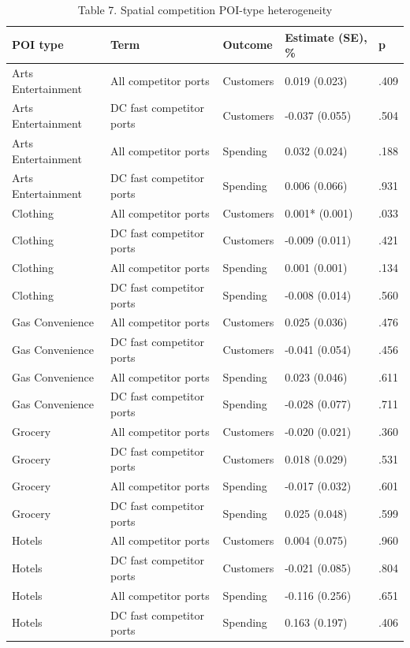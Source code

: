 \begin{table}[!htbp]
\centering
\caption{Table 7. Spatial competition POI-type heterogeneity}
\begin{tabular}{lllll}
\toprule
POI type & Term & Outcome & Estimate (SE), \% & p \\
\midrule
Arts Entertainment & All competitor ports & Customers & 0.019 (0.023) & .409 \\
Arts Entertainment & DC fast competitor ports & Customers & -0.037 (0.055) & .504 \\
Arts Entertainment & All competitor ports & Spending & 0.032 (0.024) & .188 \\
Arts Entertainment & DC fast competitor ports & Spending & 0.006 (0.066) & .931 \\
Clothing & All competitor ports & Customers & 0.001* (0.001) & .033 \\
Clothing & DC fast competitor ports & Customers & -0.009 (0.011) & .421 \\
Clothing & All competitor ports & Spending & 0.001 (0.001) & .134 \\
Clothing & DC fast competitor ports & Spending & -0.008 (0.014) & .560 \\
Gas Convenience & All competitor ports & Customers & 0.025 (0.036) & .476 \\
Gas Convenience & DC fast competitor ports & Customers & -0.041 (0.054) & .456 \\
Gas Convenience & All competitor ports & Spending & 0.023 (0.046) & .611 \\
Gas Convenience & DC fast competitor ports & Spending & -0.028 (0.077) & .711 \\
Grocery & All competitor ports & Customers & -0.020 (0.021) & .360 \\
Grocery & DC fast competitor ports & Customers & 0.018 (0.029) & .531 \\
Grocery & All competitor ports & Spending & -0.017 (0.032) & .601 \\
Grocery & DC fast competitor ports & Spending & 0.025 (0.048) & .599 \\
Hotels & All competitor ports & Customers & 0.004 (0.075) & .960 \\
Hotels & DC fast competitor ports & Customers & -0.021 (0.085) & .804 \\
Hotels & All competitor ports & Spending & -0.116 (0.256) & .651 \\
Hotels & DC fast competitor ports & Spending & 0.163 (0.197) & .406 \\

\end{tabular}
\end{table}
